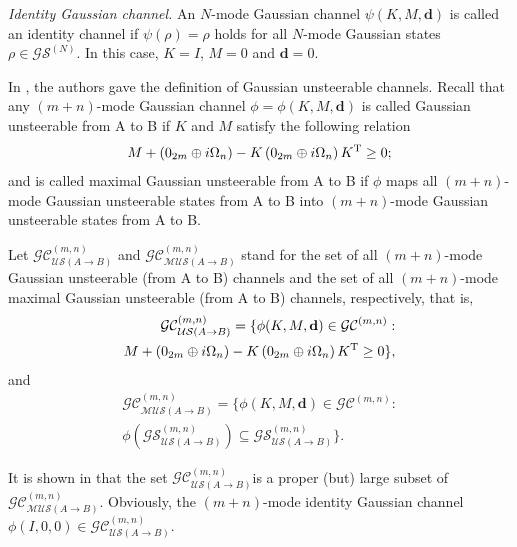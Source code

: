 \documentclass[10pt,aps,pra,amsfonts,amssymb,amsmath,%
floatfix,nofootinbib, groupedaddress,superscriptaddress,citesort,twocolumn
]{revtex4}%
\begin{document}
	
{\it  Identity Gaussian channel.}  An $N$-mode Gaussian channel $\psi(K,M,\mathbf d) $ is called an identity channel if  $\psi(\rho )=\rho$ holds  for all $N$-mode Gaussian states
$\rho\in  \mathcal{GS}^{(N)}$. In this case, $K=I$,  $M=0$ and $\mathbf d=0$.


In \cite{YHQ}, the authors gave the definition of Gaussian unsteerable channels. Recall that any $(m+n)$-mode
Gaussian channel $\phi=\phi \left({K, M,\mathbf d} \right) $ is called Gaussian unsteerable from A to B if $K$ and $M$ satisfy the following relation
\begin{eqnarray}\label{N4}
	M + ({0_{2m}} \oplus i{\Omega _n}) -K\left( {0_{2m}} \oplus i{\Omega _n} \right){K^{\rm T}} \ge 0;
\end{eqnarray}
and  is called maximal Gaussian unsteerable from A to  B if  $\phi$ maps all $(m+n)$-mode Gaussian unsteerable states  from A to  B  into $(m+n)$-mode Gaussian unsteerable states  from A to  B.  

Let  $	{\mathcal {GC}}^{(m,n)}_{\mathcal {US}(A\rightarrow B)}$ and $	{\mathcal {GC}}^{(m,n)}_{\mathcal {MUS}(A\rightarrow B)}$ stand for the set of all  $(m+n)$-mode Gaussian unsteerable  (from A to  B)  channels   and the set of all $(m+n)$-mode maximal Gaussian unsteerable  (from A to  B)   channels, respectively, that is,
\[
\begin{aligned}
	{\mathcal {GC}}^{(m,n)}_{\mathcal {US}(A\rightarrow B)}
	=\{\phi(K,M,\mathbf d) \in {\mathcal {GC}}^{(m,n)}: \\
	M + (0_{2m} \oplus i{\Omega _n}) -K\left( 0_{2m} \oplus i{\Omega _n} \right){K^{\rm T}} \ge 0\},
\end{aligned}
\]
and
\[
	\begin{aligned}
{\mathcal {GC}}^{(m,n)}_{\mathcal {MUS}(A\rightarrow B)}
	=\{ \phi(K,M,\mathbf d) \in {\mathcal {GC}}^{(m,n)}: \\
	 \phi( \mathcal  {GS}^{(m,n)}_{\mathcal {US}(A \rightarrow  B)}) \subseteq \mathcal  {GS}^{(m,n)}_{\mathcal {US}(A \rightarrow  B)} \}.
\end{aligned}
\]

It is shown in \cite{YHQ} that  %
the set  $	{\mathcal {GC}}^{(m,n)}_{\mathcal {US}(A\rightarrow B)} $is a proper  (but) large subset of  $	{\mathcal {GC}}^{(m,n)}_{\mathcal {MUS}(A\rightarrow B)}$.
 Obviously, the $(m+n)$-mode identity Gaussian channel   $\phi( I,0,0 ) \in 	{\mathcal {GC}}^{(m,n)}_{\mathcal {US}(A\rightarrow B)}$.
\end{document}
